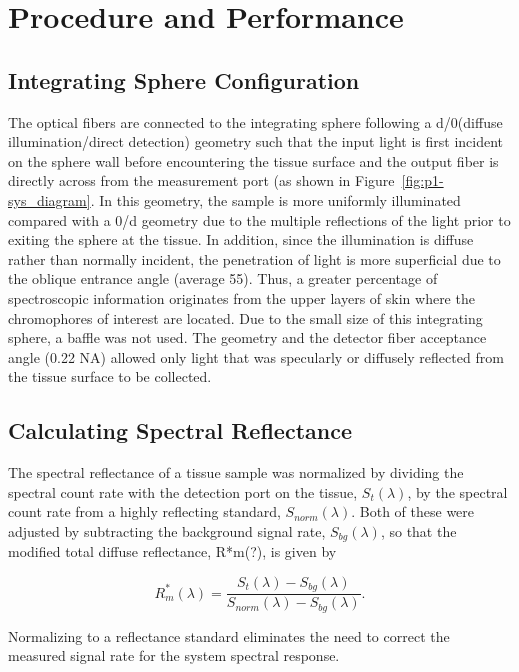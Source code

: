 \section{Procedure and Performance}

\subsection{Integrating Sphere Configuration}
The optical fibers are connected to the integrating sphere following a d/0\degree (diffuse illumination/direct detection) geometry such that the input light is first incident on the sphere wall before encountering the tissue surface and the output fiber is directly across from the measurement port (as shown in Figure~\ref{fig:p1-sys_diagram}. In this geometry, the sample is more uniformly illuminated compared with a 0\degree/d geometry due to the multiple reflections of the light prior to exiting the sphere at the tissue. In addition, since the illumination is diffuse rather than normally incident, the penetration of light is more superficial due to the oblique entrance angle (average 55\degree). Thus, a greater percentage of spectroscopic information originates from the upper layers of skin where the chromophores of interest are located. Due to the small size of this integrating sphere, a baffle was not used. The geometry and the detector fiber acceptance angle (0.22 NA) allowed only light that was specularly or diffusely reflected from the tissue surface to be collected.

\subsection{Calculating Spectral Reflectance}
The spectral reflectance of a tissue sample was normalized by dividing the spectral count rate with the detection port on the tissue, $S_t(\lambda)$, by the spectral count rate from a highly reflecting standard, $S_{norm}(\lambda)$. Both of these were adjusted by subtracting the background signal rate, $S_{bg}(\lambda)$, so that the modified total diffuse reflectance, R*m(?), is given by

\begin{equation}
	R_m^\ast(\lambda)=\frac{S_t(\lambda)-S_{bg}(\lambda)}{S_{norm}(\lambda)-S_{bg}(\lambda)}.
\end{equation}

Normalizing to a reflectance standard eliminates the need to correct the measured signal rate for the system spectral response.

